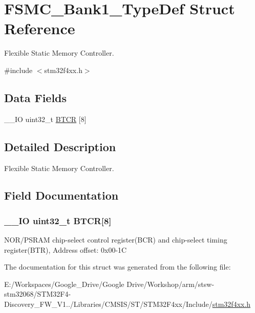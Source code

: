 \hypertarget{struct_f_s_m_c___bank1___type_def}{\section{F\-S\-M\-C\-\_\-\-Bank1\-\_\-\-Type\-Def Struct Reference}
\label{struct_f_s_m_c___bank1___type_def}
}


Flexible Static Memory Controller.  




{\ttfamily \#include $<$stm32f4xx.\-h$>$}

\subsection*{Data Fields}
\begin{DoxyCompactItemize}
\item 
\-\_\-\-\_\-\-I\-O uint32\-\_\-t \hyperlink{struct_f_s_m_c___bank1___type_def_a80a6708b507f6eecbc10424fdb088b79}{B\-T\-C\-R} \mbox{[}8\mbox{]}
\end{DoxyCompactItemize}


\subsection{Detailed Description}
Flexible Static Memory Controller. 

\subsection{Field Documentation}
\hypertarget{struct_f_s_m_c___bank1___type_def_a80a6708b507f6eecbc10424fdb088b79}{
\subsubsection[{B\-T\-C\-R}]{\setlength{\rightskip}{0pt plus 5cm}\-\_\-\-\_\-\-I\-O uint32\-\_\-t B\-T\-C\-R\mbox{[}8\mbox{]}}}\label{struct_f_s_m_c___bank1___type_def_a80a6708b507f6eecbc10424fdb088b79}
N\-O\-R/\-P\-S\-R\-A\-M chip-\/select control register(\-B\-C\-R) and chip-\/select timing register(\-B\-T\-R), Address offset\-: 0x00-\/1\-C 

The documentation for this struct was generated from the following file\-:\begin{DoxyCompactItemize}
\item 
E\-:/\-Workspaces/\-Google\-\_\-\-Drive/\-Google Drive/\-Workshop/arm/stsw-\/stm32068/\-S\-T\-M32\-F4-\/\-Discovery\-\_\-\-F\-W\-\_\-\-V1../\-Libraries/\-C\-M\-S\-I\-S/\-S\-T/\-S\-T\-M32\-F4xx/\-Include/\hyperlink{stm32f4xx_8h}{stm32f4xx.\-h}\end{DoxyCompactItemize}
